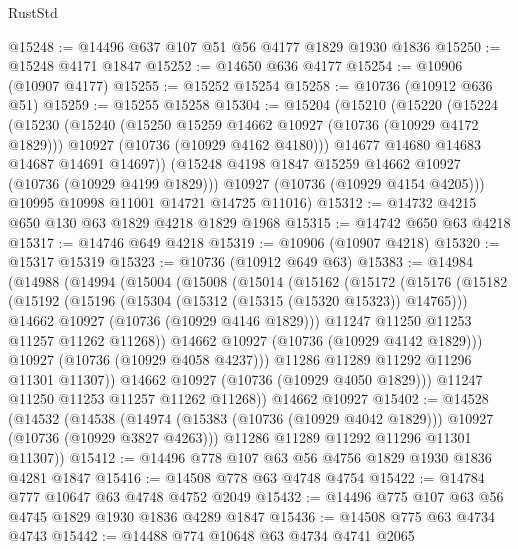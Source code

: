 \begin{lexlean}{RustStd}
\begin{coremodule}
@15248 := @14496 @637 @107 @51 @56 @4177 @1829 @1930 @1836
@15250 := @15248 @4171 @1847
@15252 := @14650 @636 @4177
@15254 := @10906 (@10907 @4177)
@15255 := @15252 @15254
@15258 := @10736 (@10912 @636 @51)
@15259 := @15255 @15258
@15304 := @15204
    (@15210
      (@15220
        (@15224
          (@15230
            (@15240
              (@15250 @15259 @14662 @10927 (@10736 (@10929 @4172 @1829)))
              @10927
              (@10736 (@10929 @4162 @4180)))
            @14677
            @14680
            @14683
            @14687
            @14691
            @14697))
        (@15248 @4198 @1847 @15259 @14662 @10927 (@10736 (@10929 @4199 @1829)))
        @10927
        (@10736 (@10929 @4154 @4205)))
      @10995
      @10998
      @11001
      @14721
      @14725
      @11016)
@15312 := @14732 @4215 @650 @130 @63 @1829 @4218 @1829 @1968
@15315 := @14742 @650 @63 @4218
@15317 := @14746 @649 @4218
@15319 := @10906 (@10907 @4218)
@15320 := @15317 @15319
@15323 := @10736 (@10912 @649 @63)
@15383 := @14984
    (@14988
      (@14994
        (@15004
          (@15008
            (@15014
              (@15162
                (@15172
                  (@15176
                    (@15182
                      (@15192
                        (@15196 (@15304 (@15312 (@15315 (@15320 @15323)) @14765)))
                        @14662
                        @10927
                        (@10736 (@10929 @4146 @1829)))
                      @11247
                      @11250
                      @11253
                      @11257
                      @11262
                      @11268))
                  @14662
                  @10927
                  (@10736 (@10929 @4142 @1829)))
                @10927
                (@10736 (@10929 @4058 @4237)))
              @11286
              @11289
              @11292
              @11296
              @11301
              @11307))
          @14662
          @10927
          (@10736 (@10929 @4050 @1829)))
        @11247
        @11250
        @11253
        @11257
        @11262
        @11268))
    @14662
    @10927
@15402 := @14528
    (@14532
      (@14538
        (@14974 (@15383 (@10736 (@10929 @4042 @1829))) @10927 (@10736 (@10929 @3827 @4263)))
        @11286
        @11289
        @11292
        @11296
        @11301
        @11307))
@15412 := @14496 @778 @107 @63 @56 @4756 @1829 @1930 @1836 @4281 @1847
@15416 := @14508 @778 @63 @4748 @4754
@15422 := @14784 @777 @10647 @63 @4748 @4752 @2049
@15432 := @14496 @775 @107 @63 @56 @4745 @1829 @1930 @1836 @4289 @1847
@15436 := @14508 @775 @63 @4734 @4743
@15442 := @14488 @774 @10648 @63 @4734 @4741 @2065

\end{coremodule}
\end{lexlean}
